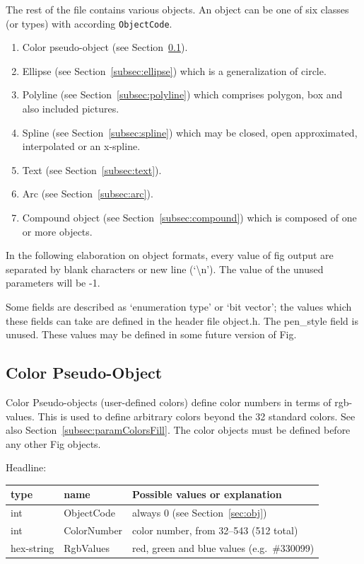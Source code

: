 \documentclass[10pt, a4paper, english]{article}%
\begin{document}
The rest of the file contains various objects.  
An object can be one of six classes (or types) with according \texttt{ObjectCode}.
%
\begin{enumerate}
\item[0]
Color pseudo-object (see Section~\ref{subsec:colorPseudoObj}). 
\item
Ellipse (see Section~\ref{subsec:ellipse}) which is a generalization of circle.
\item
Polyline (see Section~\ref{subsec:polyline}) which comprises polygon, 
box and also included pictures.
\item
Spline (see Section~\ref{subsec:spline}) 
which may be closed, open approximated, interpolated or an x-spline.
\item
Text (see Section~\ref{subsec:text}).
\item
Arc (see Section~\ref{subsec:arc}).
\item
Compound object (see Section~\ref{subsec:compound}) 
which is composed of one or more objects. 
\end{enumerate}

In the following elaboration on object formats, 
every value of fig output are separated by blank characters 
or new line (`\textbackslash{}n').  
The value of the unused parameters will be -1.

 Some fields are described as `enumeration type' or `bit vector'; the
 values which these fields can take are defined in the header file object.h.
 The pen\_style field is unused.
 These values may be defined in some future version of Fig.


\setcounter{subsection}{-1}
\subsection{Color Pseudo-Object}\label{subsec:colorPseudoObj}

Color Pseudo-objects (user-defined colors) 
define color numbers in terms of rgb-values. 
This is used to define arbitrary colors beyond the 32 standard colors. 
See also Section~\ref{subsec:paramColorsFill}. 
The color objects must be defined before any other Fig objects.

\noindent
Headline: \\
%
\begin{tabular}{lll}
\toprule
type & name & Possible values or explanation \\
\midrule
\midrule
int        & ObjectCode  & always 0 (see Section~\ref{sec:obj}) \\
int        & ColorNumber & color number, from 32--543 (512 total)\\
hex-string & RgbValues   & red, green and blue values (e.g.~\#330099) \\
\bottomrule
\end{tabular}
\end{document}
